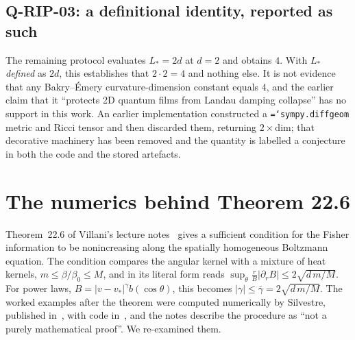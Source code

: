 \documentclass[11pt,a4paper]{article}
\newcommand{\code}[1]{\texttt{\hyphenchar\font=`\-\relax #1}}
\begin{document}
\subsection{Q-RIP-03: a definitional identity, reported as such}

The remaining protocol evaluates $L_* = 2d$ at $d=2$ and obtains $4$. With
$L_*$ \emph{defined} as $2d$, this establishes that $2\cdot2=4$ and nothing
else. It is not evidence that any Bakry--\'Emery curvature-dimension constant
equals $4$, and the earlier claim that it ``protects 2D quantum films from
Landau damping collapse'' has no support in this work. An earlier
implementation constructed a \code{sympy.diffgeom} metric and Ricci tensor and
then discarded them, returning $2\times\mathrm{dim}$; that decorative machinery
has been removed and the quantity is labelled a conjecture in both the code and
the stored artefacts.

\section{The numerics behind Theorem 22.6}
\label{sec:thm226}

Theorem~22.6 of Villani's lecture notes~\cite{villani2025} gives a sufficient condition for
the Fisher information to be nonincreasing along the spatially homogeneous Boltzmann equation. The
condition compares the angular kernel with a mixture of heat kernels,
$m\le\beta/\beta_0\le M$, and in its literal form reads
$\sup_\theta \tfrac{r}{B}|\partial_r B|\le2\sqrt{d\,m/M}$. For power laws,
$B=|v-v_*|^\gamma b(\cos\theta)$, this becomes $|\gamma|\le\bar\gamma=2\sqrt{d\,m/M}$. The worked
examples after the theorem were computed numerically by Silvestre, published
in~\cite{isv2024}, with code in~\cite{silvestre2024}, and the notes describe the procedure as
``not a purely mathematical proof''. We re-examined them.
\end{document}
